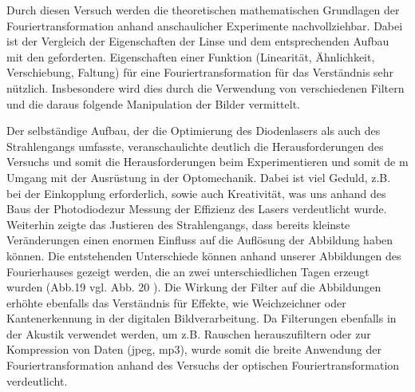 


Durch diesen Versuch werden die theoretischen mathematischen Grundlagen der Fouriertransformation anhand anschaulicher Experimente nachvollziehbar. Dabei ist der Vergleich der Eigenschaften der Linse und dem entsprechenden Aufbau mit den geforderten. Eigenschaften einer Funktion (Linearität, Ähnlichkeit, Verschiebung, Faltung) für eine Fouriertransformation für das Verständnis sehr nützlich. Insbesondere wird dies durch die Verwendung von verschiedenen Filtern und die daraus folgende Manipulation der Bilder vermittelt. 

Der selbständige Aufbau, der die Optimierung des Diodenlasers als auch des Strahlengangs umfasste, veranschaulichte deutlich die Herausforderungen des Versuchs und somit die Herausforderungen beim Experimentieren und somit de
m Umgang mit der Ausrüstung in der Optomechanik. Dabei ist viel Geduld, z.B. bei der Einkopplung erforderlich, sowie auch Kreativität, was uns anhand des Baus der Photodiodezur Messung der Effizienz des Lasers verdeutlicht wurde. Weiterhin zeigte das Justieren des Strahlengangs, dass bereits kleinste Veränderungen einen enormen Einfluss auf die Auflösung der Abbildung haben können. Die entstehenden Unterschiede können anhand unserer Abbildungen des Fourierhauses gezeigt werden, die an zwei unterschiedlichen Tagen erzeugt wurden (Abb.19 vgl. Abb. 20%
). Die Wirkung der Filter auf die Abbildungen erhöhte ebenfalls das Verständnis für Effekte, wie Weichzeichner oder Kantenerkennung in der digitalen Bildverarbeitung. Da Filterungen ebenfalls in der Akustik verwendet werden, um z.B. Rauschen herauszufiltern oder zur Kompression von Daten (jpeg, mp3), wurde somit die breite Anwendung der Fouriertransformation anhand des Versuchs der optischen Fouriertransformation verdeutlicht.




